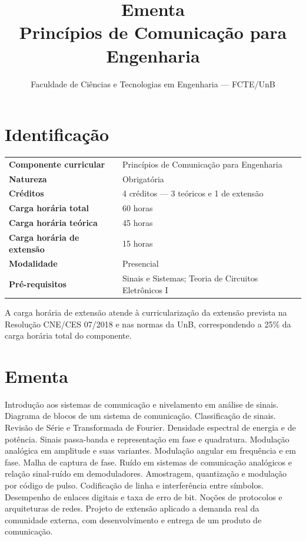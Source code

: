 \documentclass[11pt,a4paper]{article}
\title{\textbf{Ementa}\\[0.3em]\large Princípios de Comunicação para Engenharia}
\author{Faculdade de Ciências e Tecnologias em Engenharia --- FCTE/UnB}
\date{}
\begin{document}
\thispagestyle{plain}
\maketitle
\vspace{-1.0em}

\section{Identificação}

\begin{center}
\small
\begin{tabular}{@{}p{} p{}@{}}
\toprule
\textbf{Componente curricular} & Princípios de Comunicação para Engenharia \\
\textbf{Natureza} & Obrigatória \\
\textbf{Créditos} & 4 créditos --- 3 teóricos e 1 de extensão \\
\textbf{Carga horária total} & 60 horas \\
\textbf{Carga horária teórica} & 45 horas \\
\textbf{Carga horária de extensão} & 15 horas \\
\textbf{Modalidade} & Presencial \\
\textbf{Pré-requisitos} & Sinais e Sistemas; Teoria de Circuitos Eletrônicos I \\
\bottomrule
\end{tabular}
\end{center}

A carga horária de extensão atende à curricularização da extensão prevista na Resolução CNE/CES 07/2018 e nas normas da UnB, correspondendo a 25\% da carga horária total do componente.

\section{Ementa}

Introdução aos sistemas de comunicação e nivelamento em análise de sinais. Diagrama de blocos de um sistema de comunicação. Classificação de sinais. Revisão de Série e Transformada de Fourier. Densidade espectral de energia e de potência. Sinais passa-banda e representação em fase e quadratura. Modulação analógica em amplitude e suas variantes. Modulação angular em frequência e em fase. Malha de captura de fase. Ruído em sistemas de comunicação analógicos e relação sinal-ruído em demoduladores. Amostragem, quantização e modulação por código de pulso. Codificação de linha e interferência entre símbolos. Desempenho de enlaces digitais e taxa de erro de bit. Noções de protocolos e arquiteturas de redes. Projeto de extensão aplicado a demanda real da comunidade externa, com desenvolvimento e entrega de um produto de comunicação.
\end{document}
